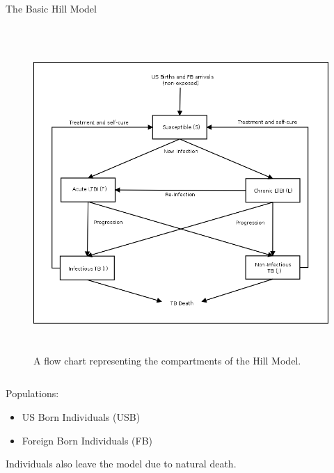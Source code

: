 \documentclass[final]{beamer}
\begin{document}
\begin{frame}
\begin{columns}
\begin{column}{.3\textwidth}
\begin{block}{The Basic Hill Model}
\begin{block}{}
\begin{column}{.5\textwidth}
\begin{figure}[h]
\begin{center}
                \includegraphics[height=12cm,width=.9\textwidth]{HillModelFlowChart}
              \end{center}
              \caption{A flow chart representing the compartments of the Hill
                       Model.}
              \label{fig:hillFlow}
            \end{figure}
          \end{column}
          \begin{column}{.43\textwidth}
            Populations:
            \begin{itemize}
              \item US Born Individuals (USB) 
              \item Foreign Born Individuals (FB)
            \end{itemize}
            Individuals also leave the model due to natural death.
          \end{column}
          \begin{figure}[h]
            \begin{center}

\end{center}
\end{figure}
\end{block}
\end{block}
\end{column}
\end{columns}
\end{frame}
\end{document}

